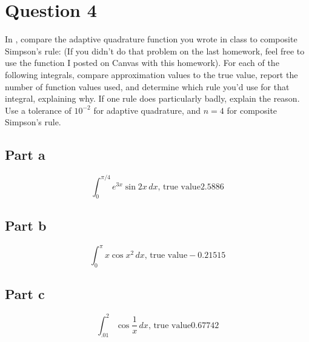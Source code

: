 \section{Question 4}

\begin{question}
    In \MATLAB, compare the adaptive quadrature function you wrote in class to composite Simpson's rule: (If you didn't do that problem on the last homework, feel free to use the function I posted on Canvas with this homework). For each of the following integrals, compare approximation values to the true value, report the number of function values used, and determine which rule you'd use for that integral, explaining why. If one rule does particularly badly, explain the reason. Use a tolerance of $10^{-2}$ for adaptive quadrature, and $n = 4$ for composite Simpson's rule.
\end{question}

\subsection{Part a}

\begin{question}
    \begin{equation}
        \int_0^{\pi/4} e^{3x} \sin 2x \, dx\text{, true value} 2.5886
    \end{equation}
\end{question}

\begin{answer}
    
\end{answer}

\subsection{Part b}

\begin{question}
    \begin{equation}
        \int_0^{\pi} x \cos x^2 \, dx\text{, true value} -0.21515
    \end{equation}
\end{question}

\begin{answer}
    
\end{answer}

\subsection{Part c}

\begin{question}
    \begin{equation}
        \int_{.01}^2 \cos \frac{1}{x}\, dx\text{, true value} 0.67742
    \end{equation}
\end{question}

\begin{answer}
    
\end{answer}